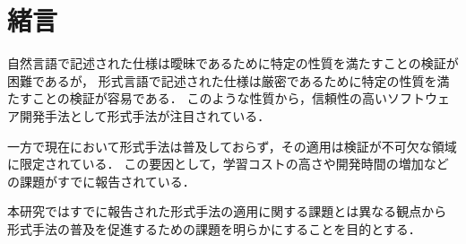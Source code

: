 \documentclass[main]{subfiles}
\begin{document}
\chapter{緒言}




自然言語で記述された仕様は曖昧であるために特定の性質を満たすことの検証が困難であるが，
形式言語で記述された仕様は厳密であるために特定の性質を満たすことの検証が容易である．
このような性質から，信頼性の高いソフトウェア開発手法として形式手法が注目されている\cite{aoki_2018}．

一方で現在において形式手法は普及しておらず，その適用は検証が不可欠な領域に限定されている．
この要因として，学習コストの高さや開発時間の増加などの課題がすでに報告されている\cite{reid_2020,huisman_2022}．

本研究ではすでに報告された形式手法の適用に関する課題とは異なる観点から形式手法の普及を促進するための課題を明らかにすることを目的とする．
\end{document}
